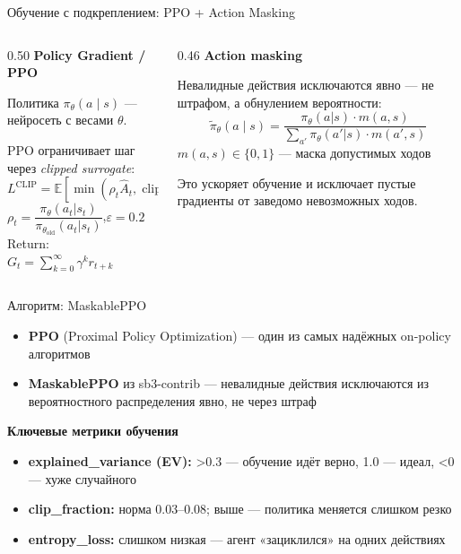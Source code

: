 \documentclass[aspectratio=169]{beamer}
\begin{document}
	\begin{frame}{Обучение с подкреплением: PPO + Action Masking}
		\begin{columns}[t]
			\begin{column}{0.50\textwidth}
				\textbf{Policy Gradient / PPO}
				
				\medskip
				Политика $\pi_\theta(a \mid s)$ — нейросеть с весами $\theta$.
				
				\medskip
				PPO ограничивает шаг через \emph{clipped surrogate}:
				\[
				L^{\text{CLIP}} = \mathbb{E}\!\left[\min\!\left(
				\rho_t \hat{A}_t,\;
				\mathrm{clip}(\rho_t, 1{\pm}\varepsilon)\,\hat{A}_t
				\right)\right]
				\]
				$\rho_t = \dfrac{\pi_\theta(a_t|s_t)}{\pi_{\theta_\text{old}}(a_t|s_t)}$,\quad $\varepsilon = 0.2$\\
				\medskip
				Return: $G_t = \sum_{k=0}^{\infty} \gamma^k r_{t+k}$
			\end{column}
			\begin{column}{0.46\textwidth}
				\textbf{Action masking}
				
				\medskip
				Невалидные действия исключаются явно — не штрафом, а обнулением вероятности:
				\[
				\tilde{\pi}_\theta(a \mid s) = \frac{\pi_\theta(a|s)\cdot m(a,s)}
				{\sum_{a'} \pi_\theta(a'|s)\cdot m(a',s)}
				\]
				$m(a,s) \in \{0,1\}$ — маска допустимых ходов
				
				\medskip
				Это ускоряет обучение и исключает пустые градиенты от заведомо невозможных ходов.
			\end{column}
		\end{columns}
	\end{frame}
	
	\begin{frame}{Алгоритм: MaskablePPO}
		\begin{itemize}
			\item \textbf{PPO} (Proximal Policy Optimization) — один из самых надёжных on-policy алгоритмов
			\item \textbf{MaskablePPO} из sb3-contrib — невалидные действия исключаются из вероятностного распределения явно, не через штраф
		\end{itemize}
		
		\bigskip
		\textbf{Ключевые метрики обучения}
		\begin{itemize}
			\item \textbf{explained\_variance (EV):} >0.3 — обучение идёт верно, 1.0 — идеал, <0 — хуже случайного
			\item \textbf{clip\_fraction:} норма 0.03–0.08; выше — политика меняется слишком резко
			\item \textbf{entropy\_loss:} слишком низкая — агент «зациклился» на одних действиях
		\end{itemize}
	\end{frame}
	
\end{document}
